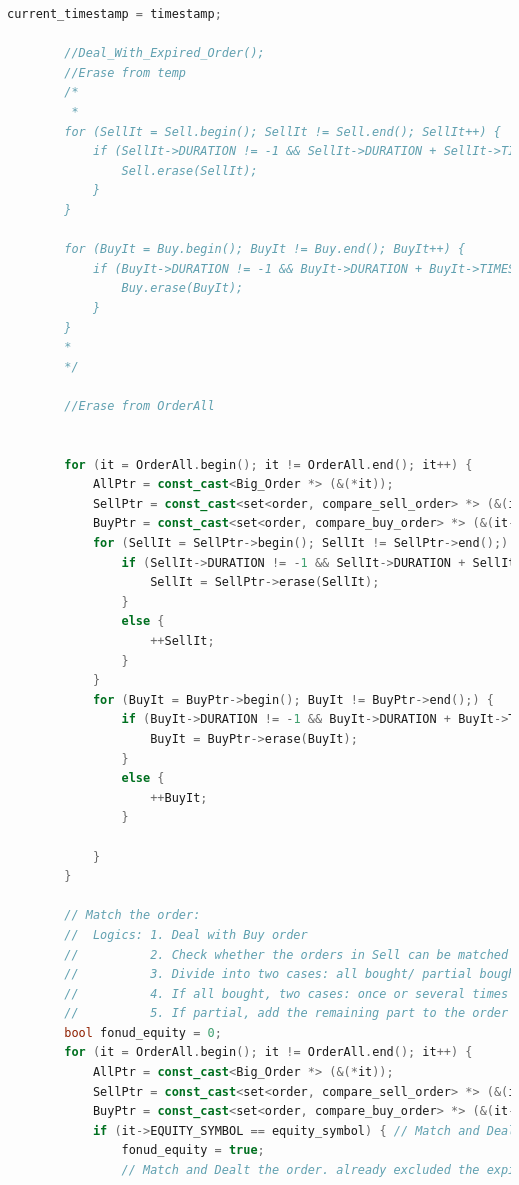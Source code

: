 \documentclass{article}
\begin{document}
\begin{lstlisting}[language=C++]
        current_timestamp = timestamp;

        //Deal_With_Expired_Order();
        //Erase from temp
        /*
         *
        for (SellIt = Sell.begin(); SellIt != Sell.end(); SellIt++) {
            if (SellIt->DURATION != -1 && SellIt->DURATION + SellIt->TIMESTAMP <= current_timestamp) {
                Sell.erase(SellIt);
            }
        }

        for (BuyIt = Buy.begin(); BuyIt != Buy.end(); BuyIt++) {
            if (BuyIt->DURATION != -1 && BuyIt->DURATION + BuyIt->TIMESTAMP <= current_timestamp) {
                Buy.erase(BuyIt);
            }
        }
        *
        */

        //Erase from OrderAll


        for (it = OrderAll.begin(); it != OrderAll.end(); it++) {
            AllPtr = const_cast<Big_Order *> (&(*it));
            SellPtr = const_cast<set<order, compare_sell_order> *> (&(it->Sell));
            BuyPtr = const_cast<set<order, compare_buy_order> *> (&(it->Buy));
            for (SellIt = SellPtr->begin(); SellIt != SellPtr->end();) {
                if (SellIt->DURATION != -1 && SellIt->DURATION + SellIt->TIMESTAMP <= current_timestamp) {
                    SellIt = SellPtr->erase(SellIt);
                }
                else {
                    ++SellIt;
                }
            }
            for (BuyIt = BuyPtr->begin(); BuyIt != BuyPtr->end();) {
                if (BuyIt->DURATION != -1 && BuyIt->DURATION + BuyIt->TIMESTAMP <= current_timestamp) {
                    BuyIt = BuyPtr->erase(BuyIt);
                }
                else {
                    ++BuyIt;
                }

            }
        }

        // Match the order:
        //  Logics: 1. Deal with Buy order
        //          2. Check whether the orders in Sell can be matched with buy (!isdone)
        //          3. Divide into two cases: all bought/ partial bought
        //          4. If all bought, two cases: once or several times
        //          5. If partial, add the remaining part to the order book.
        bool fonud_equity = 0;
        for (it = OrderAll.begin(); it != OrderAll.end(); it++) {
            AllPtr = const_cast<Big_Order *> (&(*it));
            SellPtr = const_cast<set<order, compare_sell_order> *> (&(it->Sell));
            BuyPtr = const_cast<set<order, compare_buy_order> *> (&(it->Buy));
            if (it->EQUITY_SYMBOL == equity_symbol) { // Match and Dealt
                fonud_equity = true;
                // Match and Dealt the order. already excluded the expired items deletion before.


\end{lstlisting}
\end{document}

